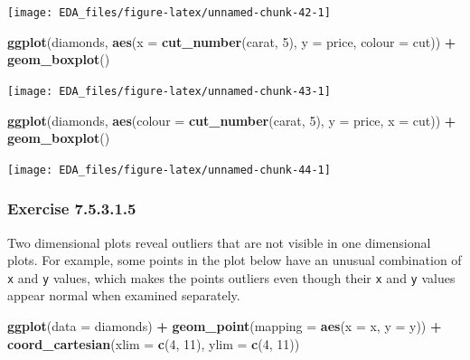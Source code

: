 \documentclass[]{book}
\newenvironment{Shaded}{\begin{snugshade}}{\end{snugshade}}
\newcommand{\DataTypeTok}[1]{\textcolor[rgb]{0.13,0.29,0.53}{#1}}
\newcommand{\DecValTok}[1]{\textcolor[rgb]{0.00,0.00,0.81}{#1}}
\newcommand{\KeywordTok}[1]{\textcolor[rgb]{0.13,0.29,0.53}{\textbf{#1}}}
\newcommand{\NormalTok}[1]{#1}
\newcommand{\OperatorTok}[1]{\textcolor[rgb]{0.81,0.36,0.00}{\textbf{#1}}}
\newcommand{\StringTok}[1]{\textcolor[rgb]{0.31,0.60,0.02}{#1}}
\theoremstyle{plain}
\theoremstyle{remark}
\begin{document}
\begin{center}\texttt{[image: EDA\_files/figure-latex/unnamed-chunk-42-1]} \end{center}

\begin{Shaded}
\begin{Highlighting}[]
\KeywordTok{ggplot}\NormalTok{(diamonds, }\KeywordTok{aes}\NormalTok{(}\DataTypeTok{x =} \KeywordTok{cut_number}\NormalTok{(carat, }\DecValTok{5}\NormalTok{), }\DataTypeTok{y =}\NormalTok{ price, }\DataTypeTok{colour =}\NormalTok{ cut)) }\OperatorTok{+}
\StringTok{  }\KeywordTok{geom_boxplot}\NormalTok{()}
\end{Highlighting}
\end{Shaded}

\begin{center}\texttt{[image: EDA\_files/figure-latex/unnamed-chunk-43-1]} \end{center}

\begin{Shaded}
\begin{Highlighting}[]
\KeywordTok{ggplot}\NormalTok{(diamonds, }\KeywordTok{aes}\NormalTok{(}\DataTypeTok{colour =} \KeywordTok{cut_number}\NormalTok{(carat, }\DecValTok{5}\NormalTok{), }\DataTypeTok{y =}\NormalTok{ price, }\DataTypeTok{x =}\NormalTok{ cut)) }\OperatorTok{+}
\StringTok{  }\KeywordTok{geom_boxplot}\NormalTok{()}
\end{Highlighting}
\end{Shaded}

\begin{center}\texttt{[image: EDA\_files/figure-latex/unnamed-chunk-44-1]} \end{center}

\hypertarget{exercise-7.5.3.1.5}{%
\subsubsection*{\texorpdfstring{Exercise {7.5.3.1.5}}{Exercise 7.5.3.1.5}}\label{exercise-7.5.3.1.5}}

Two dimensional plots reveal outliers that are not visible in one dimensional plots.
For example, some points in the plot below have an unusual combination of \texttt{x} and \texttt{y} values, which makes the points outliers even though their \texttt{x} and \texttt{y} values appear normal when examined separately.

\begin{Shaded}
\begin{Highlighting}[]
\KeywordTok{ggplot}\NormalTok{(}\DataTypeTok{data =}\NormalTok{ diamonds) }\OperatorTok{+}
\StringTok{  }\KeywordTok{geom_point}\NormalTok{(}\DataTypeTok{mapping =} \KeywordTok{aes}\NormalTok{(}\DataTypeTok{x =}\NormalTok{ x, }\DataTypeTok{y =}\NormalTok{ y)) }\OperatorTok{+}
\StringTok{  }\KeywordTok{coord_cartesian}\NormalTok{(}\DataTypeTok{xlim =} \KeywordTok{c}\NormalTok{(}\DecValTok{4}\NormalTok{, }\DecValTok{11}\NormalTok{), }\DataTypeTok{ylim =} \KeywordTok{c}\NormalTok{(}\DecValTok{4}\NormalTok{, }\DecValTok{11}\NormalTok{))}
\end{Highlighting}
\end{Shaded}
\end{document}
